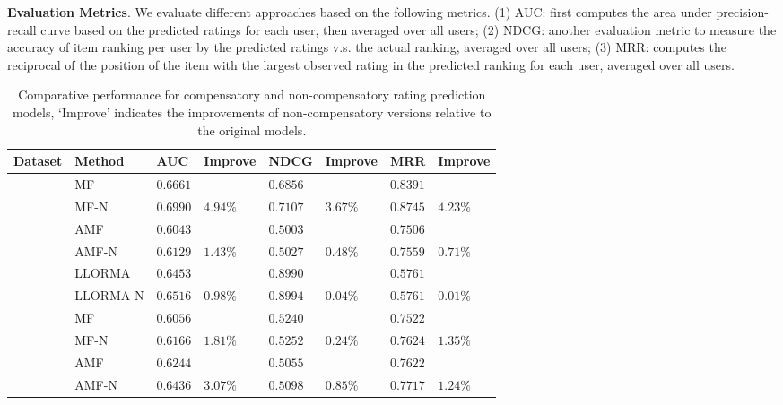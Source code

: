 \documentclass[letterpaper]{article} %
\begin{document}
\textbf{Evaluation Metrics}.  We evaluate different approaches based on the following metrics. (1) AUC: first computes the area under precision-recall curve based on the predicted ratings for each user, then averaged over all users; (2) NDCG: another evaluation metric to measure the accuracy of item ranking per user by the predicted ratings v.s. the actual ranking, averaged over all users;  (3)  MRR: computes the reciprocal of the position of the item with the largest observed rating in the predicted ranking for each user, averaged over all users. %

\begin{table}[htp]
\tiny
\caption{Comparative performance for compensatory and non-compensatory rating prediction models, `Improve' indicates the improvements of non-compensatory versions relative to the original models.}
\begin{center}
\begin{tabular}{p{0.4cm}<{\centering}|p{1.2cm}<{\centering} |p{0.5cm} p{0.6cm} |p{0.5cm} p{0.6cm} |p{0.5cm} p{0.6cm}}
\hline
Dataset	& Method	& AUC	& Improve&	NDCG&	Improve&	MRR	&Improve\\\hline
{} &	MF	& $0.6661$ 	& &	$0.6856$ 	&&	$0.8391$ 	&\\
	&MF-N	&$0.6990$ &	$4.94\%$	&$0.7107 $	&$3.67\%$	&$0.8745$ &	$4.23\%$	\\
	&AMF&	$0.6043$ 	&&	$0.5003$ 	&&	$0.7506$ &\\
	&AMF-N	&$0.6129$ 	&$1.43\%$	&$0.5027$ &	$0.48\%$	&$0.7559$ 	&$0.71\%$	\\
	&LLORMA		&$0.6453$&	&$0.8990$ 	&&	$0.5761$&\\	
	&LLORMA-N	&$0.6516$	&$0.98\%$	&	$0.8994$ 	&$0.04\%$	&$0.5761$ 	&$0.01\%$	\\
	\hline
{}	&MF	&$0.6056 $	&&	$0.5240$&&		$0.7522 $	&	\\
	&MF-N&	$0.6166$ 	&$1.81\%$	&$0.5252$ 	&$0.24\%$	&$0.7624$ 	&$1.35\%$\\
	&AMF	&$0.6244 $	&&	$0.5055 $&&		$0.7622 $	&	\\
	&AMF-N	&$0.6436$ 	&$3.07\%$	&$0.5098$ 	&$0.85\%$	&$0.7717$ 	&$1.24\%$	\\

\end{tabular}
\end{center}
\end{table}
\end{document}
